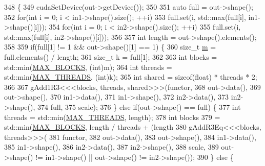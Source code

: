 \begin{DoxyCode}
348                                                                             \{
349   cudaSetDevice(out->getDevice());
350 
351   \textcolor{keyword}{auto} full = out->shape();
352   \textcolor{keywordflow}{for}(\textcolor{keywordtype}{int} i = 0; i < in1->shape().size(); ++i)
353     full.set(i, std::max(full[i], in1->shape()[i]));
354   \textcolor{keywordflow}{for}(\textcolor{keywordtype}{int} i = 0; i < in2->shape().size(); ++i)
355     full.set(i, std::max(full[i], in2->shape()[i]));
356 
357   \textcolor{keywordtype}{int} length = out->shape().elements();
358 
359   \textcolor{keywordflow}{if}(full[1] != 1 && out->shape()[1] == 1) \{
360     \textcolor{keywordtype}{size\_t} \hyperlink{namespacefix__hard_aeddecc2eb0c9f49a568cb1bf69ac50f5}{m} = full.elements() / length;
361     \textcolor{keywordtype}{size\_t} k = full[1];
362 
363     \textcolor{keywordtype}{int} blocks = std::min(\hyperlink{matrix__functions_8h_aba7f789f3266685ad8840806656e3692}{MAX\_BLOCKS}, (\textcolor{keywordtype}{int})m);
364     \textcolor{keywordtype}{int} threads = std::min(\hyperlink{matrix__functions_8h_a8b5173357adb02a86c027316e0acdfa0}{MAX\_THREADS}, (\textcolor{keywordtype}{int})k);
365     \textcolor{keywordtype}{int} shared = \textcolor{keyword}{sizeof}(float) * threads * 2;
366 
367     gAdd1R3<<<blocks, threads, shared>>>(functor,
368                                          out->data(),
369                                          out->shape(),
370                                          in1->data(),
371                                          in1->shape(),
372                                          in2->data(),
373                                          in2->shape(),
374                                          full,
375                                          scale);
376   \} \textcolor{keywordflow}{else} \textcolor{keywordflow}{if}(out->shape() == full) \{
377     \textcolor{keywordtype}{int} threads = std::min(\hyperlink{matrix__functions_8h_a8b5173357adb02a86c027316e0acdfa0}{MAX\_THREADS}, length);
378     \textcolor{keywordtype}{int} blocks
379         = std::min(\hyperlink{matrix__functions_8h_aba7f789f3266685ad8840806656e3692}{MAX\_BLOCKS}, length / threads + (length %
380     gAddR3Eq<<<blocks, threads>>>(
381         functor,
382         out->data(),
383         out->shape(),
384         in1->data(),
385         in1->shape(),
386         in2->data(),
387         in2->shape(),
388         scale,
389         out->shape() != in1->shape() || out->shape() != in2->shape());
390   \} \textcolor{keywordflow}{else} \{

\end{DoxyCode}
